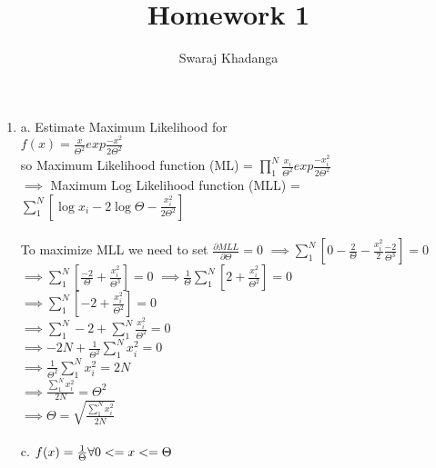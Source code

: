 \documentclass[]{report}
\title{Homework 1}
\author{Swaraj Khadanga}
\begin{document}
\maketitle

\begin{enumerate}
	\item a. Estimate Maximum Likelihood for \\
	$f(x)=\frac{x}{\Theta^2}exp{\frac{-x^2}{2\Theta^2}}$\\
	so Maximum Likelihood function (ML) = $\prod_{1}^{N}\frac{x_{i}}{\Theta^2}exp{\frac{-x_{i}^2}{2\Theta^2}}$ \\
	$\implies$ Maximum Log Likelihood function (MLL) = \\
	 $\sum_{1}^{N}[\log x_{i}-2\log \Theta-\frac{x_{i}^2}{2\Theta^2}]$ \\ \\
	To maximize MLL we need to set $\frac{\partial MLL}{\partial \Theta} = 0$
	$\implies \sum_{1}^{N}[0-\frac{2}{\Theta}-\frac{x_{i}^2}{2} \frac{-2}{\Theta^3}] = 0$ \\
	$\implies \sum_{1}^{N}[\frac{-2}{\Theta}+\frac{x_{i}^2}{\Theta^3}] = 0$	
	$\implies \frac{1}{\Theta}\sum_{1}^{N}[2+\frac{x_{i}^2}{\Theta^2}] = 0$	\\
	$\implies \sum_{1}^{N}[-2+\frac{x_{i}^2}{\Theta^2}] = 0$		\\
	$\implies \sum_{1}^{N}-2+ \sum_{1}^{N}\frac{x_{i}^2}{\Theta^2} = 0$		\\
	$\implies -2N+ \frac{1}{\Theta^2}\sum_{1}^{N}x_{i}^2 = 0$		\\
	$\implies \frac{1}{\Theta^2}\sum_{1}^{N}x_{i}^2 = 2N$		\\
	$\implies \frac{\sum_{1}^{N}x_{i}^2}{2N} = \Theta^2$		\\	
	$\implies \Theta = \sqrt{\frac{\sum_{1}^{N}x_{i}^2}{2N}}$		\\	
	\\
	c. $f(x)= \frac{1}{\Theta} \space\space\space \forall 0 <= x <= \Theta$
\end{enumerate}
\end{document}
